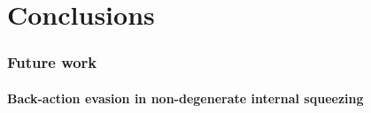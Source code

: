 \chapter{Conclusions}




\subsection{Future work}



\subsubsection*{Back-action evasion in non-degenerate internal squeezing}



